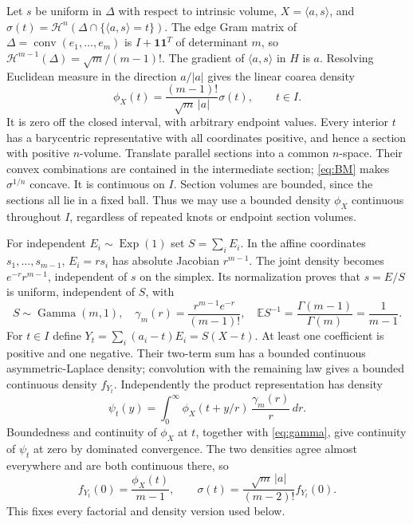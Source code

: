 \documentclass[11pt]{article}
\theoremstyle{remark}\newtheorem{remark}[theorem]{Remark}
\newcommand{\E}{\mathbb E}
\newcommand{\HH}{\mathcal H}
\newcommand{\one}{\mathbf 1}
\newcommand{\conv}{\operatorname{conv}}
\numberwithin{equation}{section}
\begin{document}
Let $s$ be uniform in $\Delta$ with respect to intrinsic volume,
$X=\langle a,s\rangle$, and
$\sigma(t)=\HH^n(\Delta\cap\{\langle a,s\rangle=t\})$.
The edge Gram matrix of $\Delta=\conv(e_1,\ldots,e_m)$ is
$I+\one\one^T$ of determinant $m$, so
$\HH^{m-1}(\Delta)=\sqrt m/(m-1)!$.
The gradient of $\langle a,s\rangle$ in $H$ is $a$. Resolving Euclidean
measure in the direction $a/|a|$ gives the linear coarea density
\begin{equation}\label{eq:coarea}
 \phi_X(t)=\frac{(m-1)!}{\sqrt m\,|a|}\sigma(t),\qquad t\in I.
\end{equation}
It is zero off the closed interval, with arbitrary endpoint values.
Every interior $t$ has a barycentric representative with all coordinates
positive, and hence a section with positive $n$-volume. Translate parallel
sections into a common $n$-space. Their convex combinations are contained
in the intermediate section; \eqref{eq:BM} makes $\sigma^{1/n}$ concave.
It is continuous on $I$. Section volumes are bounded, since the sections
all lie in a fixed ball. Thus we may use a bounded density $\phi_X$
continuous throughout $I$, regardless of repeated knots or endpoint
section volumes.

For independent $E_i\sim\operatorname{Exp}(1)$ set $S=\sum_iE_i$.
In the affine coordinates $s_1,\ldots,s_{m-1}$, $E_i=rs_i$ has absolute
Jacobian $r^{m-1}$. The joint density becomes $e^{-r}r^{m-1}$,
independent of $s$ on the simplex. Its normalization proves that $s=E/S$
is uniform, independent of $S$, with
\begin{equation}\label{eq:gamma}
 S\sim\operatorname{Gamma}(m,1),\quad
 \gamma_m(r)=\frac{r^{m-1}e^{-r}}{(m-1)!},\quad
 \E S^{-1}=\frac{\Gamma(m-1)}{\Gamma(m)}=\frac1{m-1}.
\end{equation}
For $t\in I$ define $Y_t=\sum_i(a_i-t)E_i=S(X-t)$.
At least one coefficient is positive and one negative. Their two-term
sum has a bounded continuous asymmetric-Laplace density; convolution
with the remaining law gives a bounded continuous density $f_{Y_t}$.
Independently the product representation has density
\[
 \psi_t(y)=\int_0^\infty\phi_X(t+y/r)\,\frac{\gamma_m(r)}r\,dr.
\]
Boundedness and continuity of $\phi_X$ at $t$, together with
\eqref{eq:gamma}, give continuity of $\psi_t$ at zero by dominated
convergence. The two densities agree almost everywhere and are both
continuous there, so
\begin{equation}\label{eq:section-density}
 f_{Y_t}(0)=\frac{\phi_X(t)}{m-1},\qquad
 \sigma(t)=\frac{\sqrt m\,|a|}{(m-2)!}f_{Y_t}(0).
\end{equation}
This fixes every factorial and density version used below.
\end{document}
